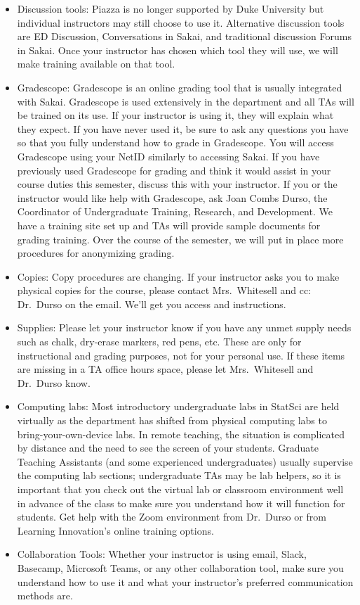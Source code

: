 \documentclass[
]{article}
\begin{document}
\begin{itemize}
\item
  Discussion tools: Piazza is no longer supported by Duke University but individual instructors may still choose to use it. Alternative discussion tools are ED Discussion, Conversations in Sakai, and traditional discussion Forums in Sakai. Once your instructor has chosen which tool they will use, we will make training available on that tool.
\item
  Gradescope: Gradescope is an online grading tool that is usually integrated with
  Sakai. Gradescope is used extensively in the department and all TAs will be trained on its use. If your instructor is using it, they will explain what they expect. If you have never used it, be sure to ask any questions you have so that you fully understand how to grade in Gradescope. You will access Gradescope using your NetID similarly to accessing Sakai. If you have previously used Gradescope for grading and think it would assist in your course duties this semester, discuss this with your instructor. If you or the instructor would like help with Gradescope, ask Joan Combs Durso, the Coordinator of Undergraduate Training, Research, and Development. We have a training site set up and TAs will provide sample documents for grading training. Over the course of the semester, we will put in place more procedures for anonymizing grading.
\item
  Copies: Copy procedures are changing. If your instructor asks you to make physical copies for the course, please contact Mrs.~Whitesell and cc: Dr.~Durso on the email. We'll get you access and instructions.
\item
  Supplies: Please let your instructor know if you have any unmet supply needs such as chalk, dry-erase markers, red pens, etc. These are only for instructional and grading purposes, not for your personal use. If these items are missing in a TA office hours space, please let Mrs.~Whitesell and Dr.~Durso know.
\item
  Computing labs: Most introductory undergraduate labs in StatSci are held virtually as the department has shifted from physical computing labs to bring-your-own-device labs. In remote teaching, the situation is complicated by distance and the need to see the screen of your students. Graduate Teaching Assistants (and some experienced undergraduates) usually supervise the computing lab sections; undergraduate TAs may be lab helpers, so it is important that you check out the virtual lab or classroom environment well in advance of the class to make sure you understand how it will function for students. Get help with the Zoom environment from Dr.~Durso or from Learning Innovation's online training options.
\item
  Collaboration Tools: Whether your instructor is using email, Slack, Basecamp, Microsoft
  Teams, or any other collaboration tool, make sure you understand how to use it and what your instructor's preferred communication methods are.
\end{itemize}
\end{document}
